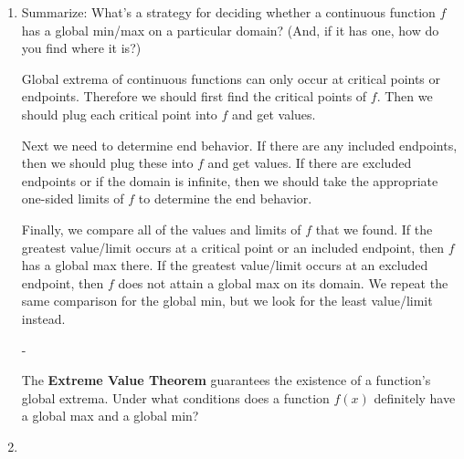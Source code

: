 \documentclass{article}
\makeatletter
\newlength{\tipmargin}
\renewenvironment{framed}{
  \setlength{\tipmargin}{\textwidth-\linewidth}
  \advance\@totalleftmargin-\tipmargin
  \def\FrameCommand{\hspace{\tipmargin}\fbox}%
  \advance\linewidth\tipmargin
  \MakeFramed {\advance\hsize-\width \FrameRestore}%
}
{\endMakeFramed}
\makeatother
\begin{document}
\begin{enumerate}
\begin{enumerate}
  \end{enumerate}

\item  \label{global-extrema-strategy-1}


  \begin{problem}[1.5in]
    Summarize: What's a strategy for deciding whether a continuous function $f$ has a global min/max on a particular domain? (And, if it has one, how do you find where it is?)
  \end{problem}

  \begin{solution}
    Global extrema of continuous functions can only occur at critical
    points or endpoints. Therefore we should first find the critical points of
    $f$. Then we should plug each critical point into $f$ and get values.

    Next we need to determine end behavior. If there are any included endpoints, 
    then we should plug these into $f$ and get
    values. If there are excluded endpoints or if the domain is infinite, then
    we should take the appropriate one-sided limits of $f$ to determine the
    end behavior. 

    Finally, we compare all of the values and limits of $f$ that we found.
    If the greatest value/limit occurs at a critical point
    or an included endpoint, then $f$ has a global max there. If
    the greatest value/limit occurs at an excluded endpoint, then
    $f$ does not attain a global max on its domain. We repeat
    the same comparison for the global min, but we look for the
    least value/limit instead.
  \end{solution}

\begin{framed}
    The {\bf Extreme Value Theorem} guarantees the existence of a function's global extrema. Under what conditions does a function $f(x)$ definitely have a global max and a global min?
    \vspace{0.5in}
\end{framed}
\item 


\end{enumerate}
\end{document}
